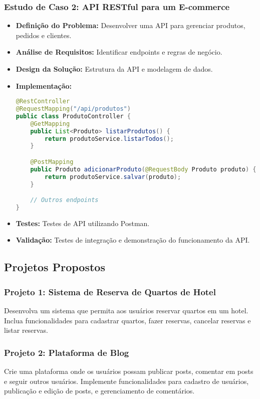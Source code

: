 \documentclass[a4paper,12pt]{book}
\begin{document}
\subsubsection{Estudo de Caso 2: API RESTful para um E-commerce}
\begin{itemize}
    \item \textbf{Definição do Problema:} Desenvolver uma API para gerenciar produtos, pedidos e clientes.
    \item \textbf{Análise de Requisitos:} Identificar endpoints e regras de negócio.
    \item \textbf{Design da Solução:} Estrutura da API e modelagem de dados.
    \item \textbf{Implementação:} 
\begin{lstlisting}[language=Java, caption=Endpoint de Produtos]
@RestController
@RequestMapping("/api/produtos")
public class ProdutoController {
    @GetMapping
    public List<Produto> listarProdutos() {
        return produtoService.listarTodos();
    }

    @PostMapping
    public Produto adicionarProduto(@RequestBody Produto produto) {
        return produtoService.salvar(produto);
    }

    // Outros endpoints
}
\end{lstlisting}
    \item \textbf{Testes:} Testes de API utilizando Postman.
    \item \textbf{Validação:} Testes de integração e demonstração do funcionamento da API.
\end{itemize}

\subsection{Projetos Propostos}
\subsubsection{Projeto 1: Sistema de Reserva de Quartos de Hotel}
Desenvolva um sistema que permita aos usuários reservar quartos em um hotel. Inclua funcionalidades para cadastrar quartos, fazer reservas, cancelar reservas e listar reservas.

\subsubsection{Projeto 2: Plataforma de Blog}
Crie uma plataforma onde os usuários possam publicar posts, comentar em posts e seguir outros usuários. Implemente funcionalidades para cadastro de usuários, publicação e edição de posts, e gerenciamento de comentários.
\end{document}
